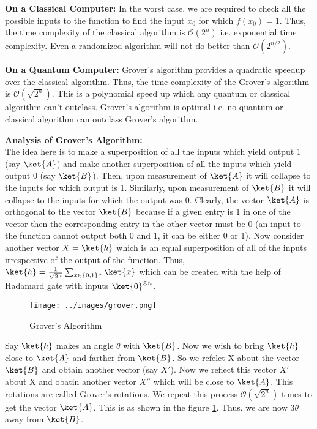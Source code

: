 \documentclass[12pt, oneside]{book}
\theoremstyle{definition}
\theoremstyle{definition}
\theoremstyle{remark}
\begin{document}
\textbf{On a Classical Computer: }In the worst case, we are required to check all the possible inputs to the function to find the input $x_0$ for which $f(x_0)=1$.
Thus, the time complexity of the classical algorithm is $\mathcal{O}(2^n)$ i.e. exponential time complexity. Even a randomized algorithm will not do better than $\mathcal{O}(2^{n/2})$.

\textbf{On a Quantum Computer: }Grover's algorithm provides a quadratic speedup over the classical algorithm. Thus, the time complexity of the Grover's algorithm is $\mathcal{O}(\sqrt{2^n})$.
This is a polynomial speed up which any quantum or classical algorithm can't outclass. Grover's algorithm is optimal i.e. no quantum or classical algorithm can outclass Grover's algorithm.

\textbf{Analysis of Grover's Algorithm: }\\
The idea here is to make a superposition of all the inputs which yield output 1 (say $\ket{A}$) and make another 
superposition of all the inputs which yield output 0 (say $\ket{B}$). Then, upon measurement of $\ket{A}$ it will collapse to the inputs for which output is 1.
Similarly, upon measurement of $\ket{B}$ it will collapse to the inputs for which the output was 0.
Clearly, the vector $\ket{A}$ is orthogonal to the vector $\ket{B}$ because if a given entry is 1 in one of the vector then the corresponding entry in the other vector must be 0 (an input to the function cannot output both 0 and 1, it can be either 0 or 1).
Now consider another vector $X=\ket{h}$ which is an equal superposition of all of the inputs irrespective of the output of the function. Thus, $\ket{h}=\frac{1}{\sqrt{2^n}}\sum_{x \in \{0,1\}^n}\ket{x}$ which can be created 
with the help of Hadamard gate with inputs $\ket{0}^{\otimes n}$. 
\begin{figure}[H]
    \centering
    \texttt{[image: ../images/grover.png]}
    \caption{Grover's Algorithm}
    \label{fig:grover}
\end{figure}
Say $\ket{h}$ makes an angle $\theta$ with $\ket{B}$. Now we wish to bring $\ket{h}$ close to $\ket{A}$ and farther from $\ket{B}$. 
So we refelct X about the vector $\ket{B}$ and obtain another vector (say $X'$). Now we reflect this vector $X'$ about X and obatin another vector $X''$ which will be close to $\ket{A}$. 
This rotations are called Grover's rotations. We repeat this process $\mathcal{O}(\sqrt{2^n})$ times to get the vector $\ket{A}$. This is as shown in the figure
\ref{fig:grover}. Thus, we are now $3\theta$ away from $\ket{B}$.\\
\end{document}
